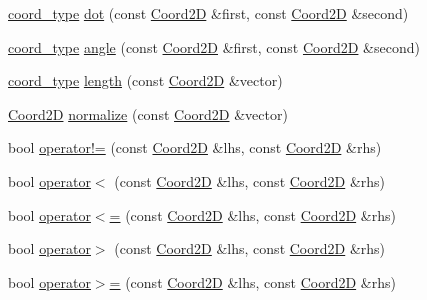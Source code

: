 \begin{DoxyCompactItemize}
\item 
\hyperlink{namespaceMcCAD_1_1Geometry_ac043b37a4a7e849fca22869e1982d2f8}{coord\+\_\+type} \hyperlink{namespaceMcCAD_1_1Geometry_ace1ce38b1f97054badfbf16d3432a2c2}{dot} (const \hyperlink{classMcCAD_1_1Geometry_1_1Coord2D}{Coord2D} \&first, const \hyperlink{classMcCAD_1_1Geometry_1_1Coord2D}{Coord2D} \&second)
\item 
\hyperlink{namespaceMcCAD_1_1Geometry_ac043b37a4a7e849fca22869e1982d2f8}{coord\+\_\+type} \hyperlink{namespaceMcCAD_1_1Geometry_aa7ab15668cf6f88ba392926c3039d5e5}{angle} (const \hyperlink{classMcCAD_1_1Geometry_1_1Coord2D}{Coord2D} \&first, const \hyperlink{classMcCAD_1_1Geometry_1_1Coord2D}{Coord2D} \&second)
\item 
\hyperlink{namespaceMcCAD_1_1Geometry_ac043b37a4a7e849fca22869e1982d2f8}{coord\+\_\+type} \hyperlink{namespaceMcCAD_1_1Geometry_ab200fce18c184178d2ec77747d51c32a}{length} (const \hyperlink{classMcCAD_1_1Geometry_1_1Coord2D}{Coord2D} \&vector)
\item 
\hyperlink{classMcCAD_1_1Geometry_1_1Coord2D}{Coord2D} \hyperlink{namespaceMcCAD_1_1Geometry_ad39938584229d5d21cf112bf47a0d852}{normalize} (const \hyperlink{classMcCAD_1_1Geometry_1_1Coord2D}{Coord2D} \&vector)
\item 
bool \hyperlink{namespaceMcCAD_1_1Geometry_add5d54ddf5e5c6c8c8431148218fb231}{operator!=} (const \hyperlink{classMcCAD_1_1Geometry_1_1Coord2D}{Coord2D} \&lhs, const \hyperlink{classMcCAD_1_1Geometry_1_1Coord2D}{Coord2D} \&rhs)
\item 
bool \hyperlink{namespaceMcCAD_1_1Geometry_a6dbab86e3f580738b7d843b880fc0caa}{operator$<$} (const \hyperlink{classMcCAD_1_1Geometry_1_1Coord2D}{Coord2D} \&lhs, const \hyperlink{classMcCAD_1_1Geometry_1_1Coord2D}{Coord2D} \&rhs)
\item 
bool \hyperlink{namespaceMcCAD_1_1Geometry_ab6dc1b7186d343fb0cc612c43f5eb171}{operator$<$=} (const \hyperlink{classMcCAD_1_1Geometry_1_1Coord2D}{Coord2D} \&lhs, const \hyperlink{classMcCAD_1_1Geometry_1_1Coord2D}{Coord2D} \&rhs)
\item 
bool \hyperlink{namespaceMcCAD_1_1Geometry_a69cd9edcab158c93bf2ae221941c8654}{operator$>$} (const \hyperlink{classMcCAD_1_1Geometry_1_1Coord2D}{Coord2D} \&lhs, const \hyperlink{classMcCAD_1_1Geometry_1_1Coord2D}{Coord2D} \&rhs)
\item 
bool \hyperlink{namespaceMcCAD_1_1Geometry_ab5170e48d3483ba44824eded75d5ae69}{operator$>$=} (const \hyperlink{classMcCAD_1_1Geometry_1_1Coord2D}{Coord2D} \&lhs, const \hyperlink{classMcCAD_1_1Geometry_1_1Coord2D}{Coord2D} \&rhs)

\end{DoxyCompactItemize}
